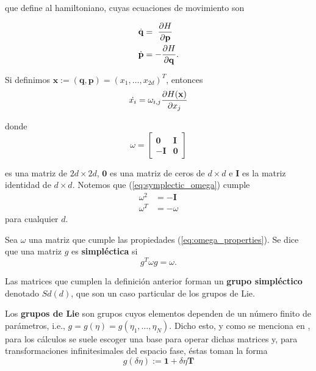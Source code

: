 que define al hamiltoniano, cuyas ecuaciones de movimiento son

\begin{align*}
 \dot{\mathbf{q}} &= \ \frac{\partial H}{\partial \mathbf{p}} \\
 \dot{\mathbf{p}} &= - \frac{\partial H}{\partial \mathbf{q}}. 
\end{align*}

Si definimos $\mathbf{x} := (\mathbf{q},\mathbf{p}) = (x_1,\ldots,x_{2d})^T$, entonces
\begin{equation}
 \dot{x_i} = \omega_{i,j} \frac{\partial H(\mathbf{x})}{\partial x_j}
 \label{eq:symplectic_ham_ode}
\end{equation}

donde
\begin{equation}
 \omega = 
    \begin{bmatrix}
    \mathbf{0} & \mathbf{I} \\
    -\mathbf{I} & \mathbf{0}
  \end{bmatrix}
 \label{eq:symplectic_omega}
\end{equation}

es una matriz de $2d\times 2d$, $\mathbf{0}$ es una matriz de ceros de $d\times d$ e $\mathbf{I}$ es la matriz identidad de $d\times d$. Notemos que (\ref{eq:symplectic_omega}) cumple
\begin{align}
 \omega^2 &= -\mathbf{I}  \nonumber \\
 \omega^T &= -\omega
 \label{eq:omega_properties}
\end{align}
para cualquier $d$.

\begin{definicion}
Sea $\omega$ una matriz que cumple las propiedades (\ref{eq:omega_properties}). Se dice que una matriz $g$ es \textbf{simpléctica} si
\begin{equation}
 g^T \omega g = \omega.
 \label{eq:symplectic_condition}
\end{equation}
\end{definicion}

Las matrices que cumplen la definición anterior forman un \textbf{grupo simpléctico} denotado $Sd(d)$, que son un caso particular de los grupos de Lie.

Los \textbf{grupos de Lie} son grupos cuyos elementos dependen de un número finito de parámetros, i.e., $g = g(\eta) = g(\eta_1,\ldots,\eta_N)$. Dicho esto, y como se menciona en \cite{CBHamiltonianDynamics}, para los cálculos se suele escoger una base para operar dichas matrices y, para transformaciones infinitesimales del espacio fase, éstas toman la forma
\begin{equation}
 g(\delta \eta) := \mathbf{1} + \delta \eta \mathbf{T}
 \label{eq:symp_infinit_rotation}
\end{equation}

